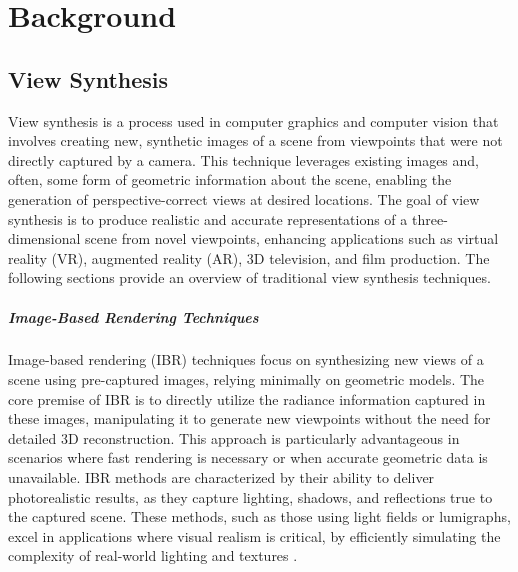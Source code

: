 %
\chapter{Background}
\label{sec:background}

\section{View Synthesis}

View synthesis is a process used in computer graphics and computer vision that involves creating new, synthetic images of a scene from viewpoints that were not directly captured by a camera.
This technique leverages existing images and, often, some form of geometric information about the scene, enabling the generation of perspective-correct views at desired locations.
The goal of view synthesis is to produce realistic and accurate representations of a three-dimensional scene from novel viewpoints, enhancing applications such as virtual reality (VR), augmented reality (AR), 3D television, and film production.
The following sections provide an overview of traditional view synthesis techniques.

\paragraph{Image-Based Rendering Techniques}
Image-based rendering (IBR) techniques focus on synthesizing new views of a scene using pre-captured images, relying minimally on geometric models.
The core premise of IBR is to directly utilize the radiance information captured in these images, manipulating it to generate new viewpoints without the need for detailed 3D reconstruction.
This approach is particularly advantageous in scenarios where fast rendering is necessary or when accurate geometric data is unavailable.
IBR methods are characterized by their ability to deliver photorealistic results, as they capture lighting, shadows, and reflections true to the captured scene.
These methods, such as those using light fields or lumigraphs, excel in applications where visual realism is critical, by efficiently simulating the complexity of real-world lighting and textures \cite{buehler_unstructured_2001,chen_view_1993,debevec_modeling_1996,gortler_lumigraph_1996,levoy_light_1996}.

